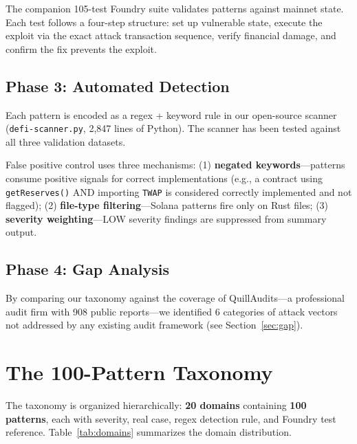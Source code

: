 \documentclass[runningheads]{llncs}
\begin{document}
The companion 105-test Foundry suite validates patterns against mainnet state. Each test follows a four-step structure: set up vulnerable state, execute the exploit via the exact attack transaction sequence, verify financial damage, and confirm the fix prevents the exploit.

\subsection{Phase 3: Automated Detection}

Each pattern is encoded as a regex + keyword rule in our open-source scanner (\texttt{defi-scanner.py}, 2,847 lines of Python). The scanner has been tested against all three validation datasets.

False positive control uses three mechanisms: (1) \textbf{negated keywords}—patterns consume positive signals for correct implementations (e.g., a contract using \texttt{getReserves()} AND importing \texttt{TWAP} is considered correctly implemented and not flagged); (2) \textbf{file-type filtering}—Solana patterns fire only on Rust files; (3) \textbf{severity weighting}—LOW severity findings are suppressed from summary output.

\subsection{Phase 4: Gap Analysis}

By comparing our taxonomy against the coverage of QuillAudits—a professional audit firm with 908 public reports—we identified 6 categories of attack vectors not addressed by any existing audit framework (see Section~\ref{sec:gap}).

\section{The 100-Pattern Taxonomy}

The taxonomy is organized hierarchically: \textbf{20 domains} containing \textbf{100 patterns}, each with severity, real case, regex detection rule, and Foundry test reference. Table~\ref{tab:domains} summarizes the domain distribution.
\end{document}
